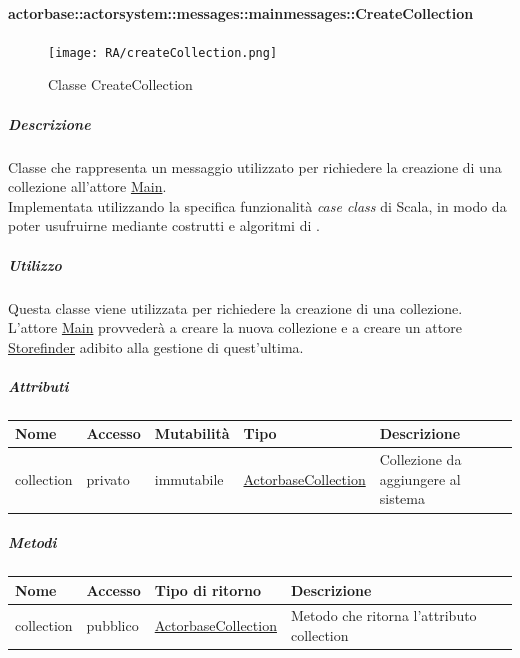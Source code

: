 \documentclass{scalatekids-article}
\begin{document}
\paragraph{actorbase::actorsystem::messages::mainmessages::CreateCollection}
\label{sec:actorbase::actorsystem::messages::mainmessages::CreateCollection}

\begin{figure}[H]
  \begin{center}
    \texttt{[image: RA/createCollection.png]}
    \caption{Classe CreateCollection}
  \end{center}
\end{figure}

\subparagraph{Descrizione}
Classe che rappresenta un messaggio utilizzato per richiedere la creazione di una collezione all'attore \hyperref[sec:actorbase::actorsystem::actors::main::Main]{Main}.\\Implementata
utilizzando la specifica funzionalità \textit{case class} di Scala, in modo da poter usufruirne mediante costrutti e algoritmi di
.

\subparagraph{Utilizzo}
Questa classe viene utilizzata per richiedere la creazione di una collezione.\\L'attore
\hyperref[sec:actorbase::actorsystem::actors::main::Main]{Main} provvederà a creare la nuova collezione e a creare un attore \hyperref[sec:actorbase::actorsystem::actors::storefinder::Storefinder]{Storefinder}
adibito alla gestione di quest'ultima.

\subparagraph{Attributi}
\begin{tabular}{| p{2cm} | p{1.5cm} | p{2cm} | p{3cm} | p{8.5cm} |}
  \hline
  Nome & Accesso & Mutabilità & Tipo & Descrizione\\
  \hline
  collection & privato & immutabile & \hyperref[sec:actorbase::actorsystem::utils::ActorbaseCollection]{ActorbaseCollection} & Collezione da aggiungere al sistema\\
  \hline
\end{tabular}

\subparagraph{Metodi}
\begin{tabular}{| l | l | l | l |}
  \hline
  Nome & Accesso & Tipo di ritorno & Descrizione\\
  \hline
  collection & pubblico & \hyperref[sec:actorbase::actorsystem::utils::ActorbaseCollection]{ActorbaseCollection} & Metodo che ritorna l'attributo collection\\
  \hline
\end{tabular}
\end{document}
